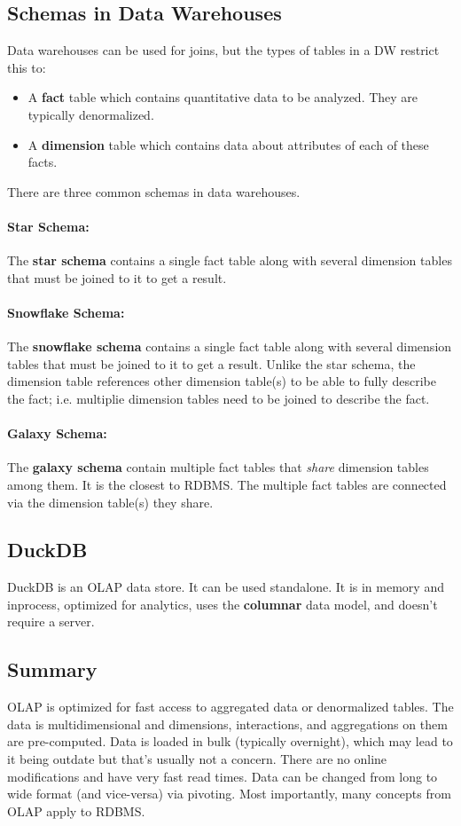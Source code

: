 \documentclass{report}
\renewcommand{\bf}[1]{\textbf{{#1}}}
\renewcommand{\it}[1]{\textit{{#1}}}
\begin{document}
\subsection{Schemas in Data Warehouses}
Data warehouses can be used for joins, but the types of tables in a DW restrict
this to:
\begin{itemize}[label=$\to$]
    \item A \bf{fact} table which contains quantitative data to be analyzed.
        They are typically denormalized.
    \item A \bf{dimension} table which contains data about attributes of each of
        these facts.
\end{itemize}
There are three common schemas in data warehouses.
\paragraph{Star Schema:} The \bf{star schema} contains a single fact table along
with several dimension tables that must be joined to it to get a result.

\paragraph{Snowflake Schema:} The \bf{snowflake schema} contains a single fact
table along with several dimension tables that must be joined to it to get a
result. Unlike the star schema, the dimension table references other dimension
table(s) to be able to fully describe the fact; i.e. multiplie dimension tables
need to be joined to describe the fact.

\paragraph{Galaxy Schema:} The \bf{galaxy schema} contain multiple fact tables
that \it{share} dimension tables among them. It is the closest to RDBMS. The
multiple fact tables are connected via the dimension table(s) they share.


\subsection{DuckDB}
DuckDB is an OLAP data store. It can be used standalone. It is in memory and
inprocess, optimized for analytics, uses the \bf{columnar} data model, and
doesn't require a server.

\subsection{Summary}
OLAP is optimized for fast access to aggregated data or denormalized tables. The
data is multidimensional and dimensions, interactions, and aggregations on them
are pre-computed. Data is loaded in bulk (typically overnight), which may lead
to it being outdate but that's usually not a concern. There are no online
modifications and have very fast read times. Data can be changed from long to
wide format (and vice-versa) via pivoting. Most importantly, many concepts from
OLAP apply to RDBMS.
\end{document}
